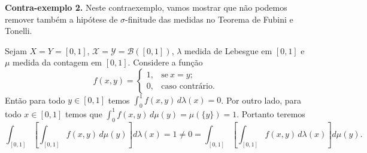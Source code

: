 \bigskip 
\noindent\textbf{Contra-exemplo 2.} 
Neste contraexemplo, vamos mostrar que não podemos 
remover também a hipótese de $\sigma$-finitude 
das medidas no Teorema de Fubini e
Tonelli.

Sejam $X=Y=[0,1]$, $\mathscr{X}=\mathscr{Y}=\mathscr{B}([0,1])$,
$\lambda$ medida de Lebesgue em $[0,1]$
e $\mu$ medida da contagem em $[0,1]$.
Considere a função 
\[
	f(x,y)
	=
	\begin{cases}
	1,&\text{se}\ x=y;
	\\
	0,&\text{caso contrário}.
	\end{cases}
\]
Então para todo $y\in [0,1]$ temos 
$\int_0^1 f(x,y)\, d\lambda(x)=0$.
Por outro lado, para todo $x\in [0,1]$ temos que
$\int_0^1 f(x,y)\, d\mu(y)=\mu(\{y\})=1$.
Portanto teremos 
\[
\int_{[0,1]}\left[ \int_{[0,1]} f(x,y)\, d\mu(y) \right]d\lambda(x)
=
1
\neq
0
=
\int_{[0,1]}\left[ \int_{[0,1]} f(x,y)\, d\lambda(x) \right]d\mu(y).
\]